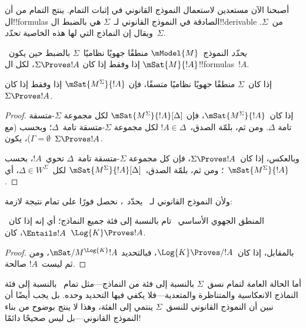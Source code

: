 \documentclass[../../../include/open-logic-section]{subfiles}
\begin{document}


أصبحنا الآن مستعدين لاستعمال النموذج القانوني في إثبات التمام. ينتج
التمام من أن ال!!{formula}s الصادقة في النموذج القانوني لـ~$\Sigma$
هي بالضبط ال!!{derivable} من~$\Sigma$. ويقال إن النماذج التي لها هذه
الخاصية \emph{تحدّد}~$\Sigma$.

\begin{defn}
  \emph{يحدّد} النموذج~$\mModel{M}$ منطقًا جهويًا نظاميًا~$\Sigma$
  بالضبط حين يكون~$\mSat{M}{!A}$ إذا وفقط إذا كان
  $\Sigma \Proves !A$، لكل ال!!{formula}s~$!A$.
\end{defn}

\begin{thm}[التحديد]
  إذا كان~$\Sigma$ منطقًا جهويًا نظاميًا متسقًا، فإن
  $\mSat{M^\Sigma}{!A}$ إذا وفقط إذا كان~$\Sigma \Proves !A$.
\end{thm}

\begin{proof}
  إذا كان~$\mSat{M^\Sigma}{!A}$، فإن
  $\mSat{M^\Sigma}{!A}[\Delta]$ لكل مجموعة $\Sigma$-متسقة تامة
  $\Delta$. ومن ثم، بلمّة الصدق،~$!A \in \Delta$ لكل مجموعة
  $\Sigma$-متسقة تامة~$\Delta$؛ وبحسب
   (مع
  $\Gamma = \emptyset$)، يكون~$\Sigma \Proves !A$.

  وبالعكس، إذا كان~$\Sigma \Proves !A$، فإن كل مجموعة $\Sigma$-متسقة
  تامة~$\Delta$ تحوي~$!A$، بحسب
  ؛ ومن ثم،
  بلمّة الصدق،~$\mSat{M^\Sigma}{!A}[\Delta]$ لكل~$\Delta \in
  W^\Sigma$، أي~$\mSat{M^\Sigma}{!A}$.
\end{proof}

ولأن النموذج القانوني لـ~ يحدّد~، نحصل فورًا على تمام
 نتيجة لازمة:

\begin{cor}
  المنطق الجهوي الأساسي~ تام بالنسبة إلى فئة جميع النماذج؛
  أي إنه إذا كان~$\Entails !A$، كان~$\Log{K} \Proves !A$.
\end{cor}

\begin{proof}
  بالمقابل، إذا كان~$\Log{K} \Proves/ !A$، فبالتحديد
  $\mSat/{M^{\Log{K}}}{!A}$، ومن ثم ليست~$!A$ صالحة.
\end{proof}

أما الحالة العامة لتمام نسق~$\Sigma$ بالنسبة إلى فئة من النماذج---مثل
تمام~ بالنسبة إلى فئة النماذج الانعكاسية والمتناظرة
والمتعدية---فلا يكفي فيها التحديد وحده. بل يجب أيضًا أن نبين أن النموذج
القانوني للنسق~$\Sigma$ ينتمي إلى الفئة، وهذا لا ينتج بوضوح من بناء
النموذج القانوني---بل ليس صحيحًا دائمًا!
\end{document}
